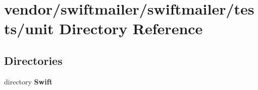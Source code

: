 \section{vendor/swiftmailer/swiftmailer/tests/unit Directory Reference}
\label{dir_94806010715f4cf85277d2913e68a0f0}
\subsection*{Directories}
\begin{DoxyCompactItemize}
\item 
directory {\bf Swift}
\end{DoxyCompactItemize}
